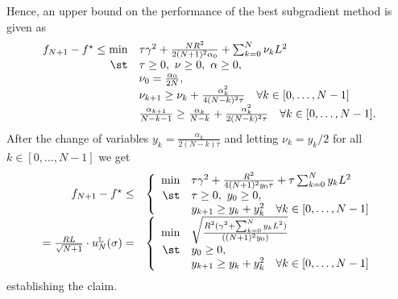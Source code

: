 \documentclass{article}
\begin{document}
\begin{appendixproof}
Hence, an upper bound on the performance of the best subgradient method is given as
\[
  \begin{array}{rl}
    f_{N+1}-f^\star \leq \min  & \tau \gamma^2 +  \frac{NR^2}{2(N+1)^2 \alpha_0} + \sum_{k=0}^{N} \nu_k L^2 \\
    \st & \tau\geq 0, ~\nu\geq 0, ~\alpha\geq 0,\\
                               & \nu_ 0 = \frac{\alpha_0}{2N},\\
                               & \nu_{k+1} \geq \nu_{k} + \frac{\alpha_{k}^2}{4 (N-k)^2 \tau} \quad \forall k \in [0, \dots, N-1]\\
          & \frac{\alpha_{k+1}}{N-k-1} \geq \frac{\alpha_{k}}{N-k} + \frac{\alpha^2_{k}}{2 (N-k)^2 \tau} \quad \forall k\in [0, \dots, N-1].
  \end{array}
\]
After the change of variables $y_k=\tfrac{\alpha_k}{2(N-k)\tau}$ and letting $\nu_k=y_k/2$ for all $k\in [0, \dots, N-1]$ we get
\[
  \begin{array}{rl}
    f_{N+1}-f^\star \leq & \left\{
                           \begin{array}{rl}
                             \min  & \tau \gamma^2 +  \frac{R^2}{4(N+1)^2 y_0\tau} + \tau \sum_{k=0}^{N} y_k L^2 \\
                             \st & \tau\geq 0, ~y_0\geq 0,\\
                                   & y_{k+1} \geq y_{k} + y_{k}^2 \quad \forall k\in [0, \dots, N-1]
                           \end{array}\right.\\
    = \frac{RL}{\sqrt{N+1}}\cdot u^{\mathbb L}_N(\sigma) = &  \left\{
                           \begin{array}{rl}
                             \min  & \sqrt{\tfrac{R^2(\gamma^2 + \sum_{k=0}^{N} y_k L^2)}{((N+1)^2y_0)}}\\
                             \st & y_0\geq 0,\\
                                   & y_{k+1} \geq y_{k} + y_k^2 \quad \forall k\in [0, \dots, N-1]
                           \end{array}\right.                           
  \end{array}
\]
establishing the claim.
\end{appendixproof}
\end{document}
